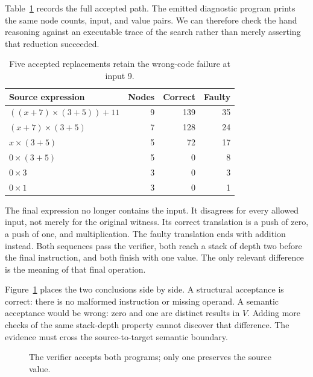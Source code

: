 Table~\ref{tab:tiny-reduction-steps} records the full accepted path.
The emitted diagnostic program prints the same node counts, input, and value pairs.
We can therefore check the hand reasoning against an executable trace of the search rather than merely asserting that reduction succeeded.

\begin{table}
  \centering
  \caption{Five accepted replacements retain the wrong-code failure at input 9.}
  \label{tab:tiny-reduction-steps}
  \begin{tabular}{lrrr}
    \toprule
    Source expression & Nodes & Correct & Faulty \\
    \midrule
    $((x+7)\times(3+5))+11$ & 9 & 139 & 35 \\
    $(x+7)\times(3+5)$ & 7 & 128 & 24 \\
    $x\times(3+5)$ & 5 & 72 & 17 \\
    $0\times(3+5)$ & 5 & 0 & 8 \\
    $0\times3$ & 3 & 0 & 3 \\
    $0\times1$ & 3 & 0 & 1 \\
    \bottomrule
  \end{tabular}
\end{table}

The final expression no longer contains the input.
It disagrees for every allowed input, not merely for the original witness.
Its correct translation is a push of zero, a push of one, and multiplication.
The faulty translation ends with addition instead.
Both sequences pass the verifier, both reach a stack of depth two before the final instruction, and both finish with one value.
The only relevant difference is the meaning of that final operation.

Figure~\ref{fig:tiny-fault-diagnosis} places the two conclusions side by side.
A structural acceptance is correct: there is no malformed instruction or missing operand.
A semantic acceptance would be wrong: zero and one are distinct results in $V$.
Adding more checks of the same stack-depth property cannot discover that difference.
The evidence must cross the source-to-target semantic boundary.

\begin{figure}
  \centering
  \caption{The verifier accepts both programs; only one preserves the source value.}
  \label{fig:tiny-fault-diagnosis}
\end{figure}

